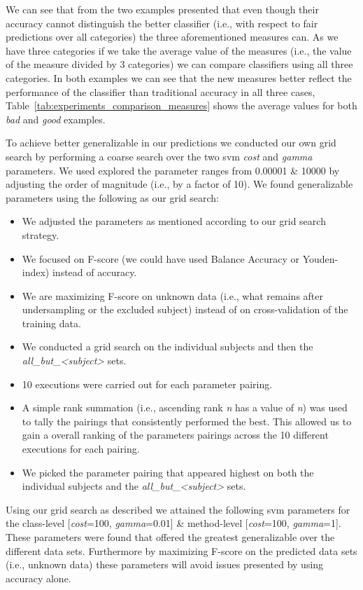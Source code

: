 We can see that from the two examples presented that even though their accuracy cannot distinguish the better classifier (i.e., with respect to fair predictions over all categories) the three aforementioned measures can. As we have three categories if we take the average value of the measures (i.e., the value of the measure divided by 3 categories) we can compare classifiers using all three categories. In both examples we can see that the new measures better reflect the performance of the classifier than traditional accuracy in all three cases, Table~\ref{tab:experiments_comparison_measures} shows the average values for both \emph{bad} and \emph{good} examples.

To achieve better generalizable in our predictions we conducted our own grid search by performing a coarse search over the two \gls{svm} \emph{cost} and \emph{gamma} parameters. We used explored the parameter ranges from 0.00001 \& 10000 by adjusting the order of magnitude (i.e., by a factor of 10). We found generalizable parameters using the following as our grid search:

\begin{itemize}
  \item We adjusted the parameters as mentioned according to our grid search strategy.
  \item We focused on F-score (we could have used Balance Accuracy or Youden-index) instead of accuracy.
  \item We are maximizing F-score on unknown data (i.e., what remains after undersampling or the excluded subject) instead of on cross-validation of the training data.
  \item We conducted a grid search on the individual subjects and then the \emph{all\_but\_<subject>} sets.
  \item 10 executions were carried out for each parameter pairing.
  \item A simple rank summation (i.e., ascending rank \emph{n} has a value of \emph{n}) was used to tally the pairings that consistently performed the best. This allowed us to gain a overall ranking of the parameters pairings across the 10 different executions for each pairing.
  \item We picked the parameter pairing that appeared highest on both the individual subjects and the \emph{all\_but\_<subject>} sets.
\end{itemize}

Using our grid search as described we attained the following \gls{svm} parameters for the class-level [\emph{cost}=100, \emph{gamma}=0.01] \& method-level [\emph{cost}=100, \emph{gamma}=1]. These parameters were found that offered the greatest generalizable over the different data sets. Furthermore by maximizing F-score on the predicted data sets (i.e., unknown data) these parameters will avoid issues presented by using accuracy alone.

